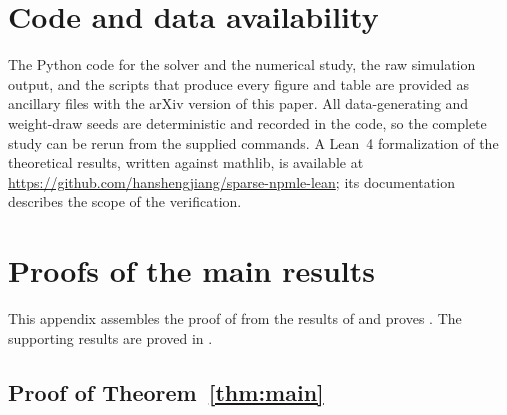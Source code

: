 \documentclass[11pt]{article}
\newcommand{\leanrepo}{\url{https://github.com/hanshengjiang/sparse-npmle-lean}}
\theoremstyle{definition}
\theoremstyle{remark}
\begin{document}
\section*{Code and data availability}

The Python code for the solver and the numerical study, the raw simulation
output, and the scripts that produce every figure and table are provided as
ancillary files with the arXiv version of this paper.  All data-generating
and weight-draw seeds are deterministic and recorded in the code, so the
complete study can be rerun from the supplied commands.  A Lean~4
formalization of the theoretical results, written against mathlib, is
available at \leanrepo; its documentation describes the scope of
the verification.


\appendix
{}

\section{Proofs of the main results}
\label{app:main-proofs}

This appendix assembles the proof of  from the results of
 and proves
.  The supporting results are proved in
.

\subsection{Proof of Theorem~\ref{thm:main}}\label{app:proof-main}
\end{document}
